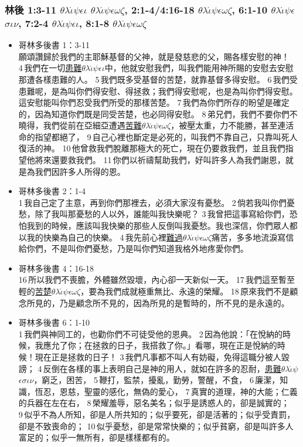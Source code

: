 \subsubsection{林後 1:3-11 $\theta$$\lambda$$\acute{\iota}$$\psi$$\epsilon$$\iota$ $\theta$$\lambda$$\acute{\iota}$$\psi$$\epsilon$$\omega$$\zeta$,  2:1-4/4:16-18 $\theta$$\lambda$$\acute{\iota}$$\psi$$\epsilon$$\omega$$\zeta$, 6:1-10 $\theta$$\lambda$$\acute{\iota}$$\psi$$\epsilon$$\sigma$$\iota$$\nu$,  7:2-4 $\theta$$\lambda$$\acute{\iota}$$\psi$$\epsilon$$\iota$, 8:1-8 $\theta$$\lambda$$\acute{\iota}$$\psi$$\epsilon$$\omega$$\zeta$}
\begin{itemize} 
\itemsep-.25em
\item{哥林多後書 1：3-11}\\ 願頌讚歸於我們的主耶穌基督的父神，就是發慈悲的父，賜各樣安慰的神！ 4 我們在一切\underline{患難$\theta$$\lambda$$\acute{\iota}$$\psi$$\epsilon$$\iota$}中，他就安慰我們，叫我們能用神所賜的安慰去安慰那遭各樣患難的人。 5 我們既多受基督的苦楚，就靠基督多得安慰。 6 我們受患難呢，是為叫你們得安慰、得拯救；我們得安慰呢，也是為叫你們得安慰。這安慰能叫你們忍受我們所受的那樣苦楚。 7 我們為你們所存的盼望是確定的，因為知道你們既是同受苦楚，也必同得安慰。 8 弟兄們，我們不要你們不曉得，我們從前在亞細亞遭遇\underline{苦難$\theta$$\lambda$$\acute{\iota}$$\psi$$\epsilon$$\omega$$\zeta$}，被壓太重，力不能勝，甚至連活命的指望都絕了， 9 自己心裡也斷定是必死的，叫我們不靠自己，只靠叫死人復活的神。 10 他曾救我們脫離那極大的死亡，現在仍要救我們，並且我們指望他將來還要救我們。 11 你們以祈禱幫助我們，好叫許多人為我們謝恩，就是為我們因許多人所得的恩。
\item{哥林多後書 2：1-4} \\ 1 我自己定了主意，再到你們那裡去，必須大家沒有憂愁。 2 倘若我叫你們憂愁，除了我叫那憂愁的人以外，誰能叫我快樂呢？ 3 我曾把這事寫給你們，恐怕我到的時候，應該叫我快樂的那些人反倒叫我憂愁。我也深信，你們眾人都以我的快樂為自己的快樂。 4 我先前心裡\underline{難過$\theta$$\lambda$$\acute{\iota}$$\psi$$\epsilon$$\omega$$\zeta$}痛苦，多多地流淚寫信給你們，不是叫你們憂愁，乃是叫你們知道我格外地疼愛你們。
\item{哥林多後書 4：16-18} \\ 16 所以我們不喪膽，外體雖然毀壞，內心卻一天新似一天。 17 我們這至暫至輕的\underline{苦楚$\theta$$\lambda$$\acute{\iota}$$\psi$$\epsilon$$\omega$$\zeta$}，要為我們成就極重無比、永遠的榮耀。 18 原來我們不是顧念所見的，乃是顧念所不見的，因為所見的是暫時的，所不見的是永遠的。     
\item{哥林多後書 6：1-10} \\1 我們與神同工的，也勸你們不可徒受他的恩典。 2 因為他說：「在悅納的時候，我應允了你；在拯救的日子，我搭救了你。」看哪，現在正是悅納的時候！現在正是拯救的日子！ 3 我們凡事都不叫人有妨礙，免得這職分被人毀謗； 4 反倒在各樣的事上表明自己是神的用人，就如在許多的忍耐，\underline{患難$\theta$$\lambda$$\acute{\iota}$$\psi$$\epsilon$$\sigma$$\iota$$\nu$}，窮乏，困苦， 5 鞭打，監禁，擾亂，勤勞，警醒，不食， 6 廉潔，知識，恆忍，恩慈，聖靈的感化，無偽的愛心， 7 真實的道理，神的大能；仁義的兵器在左在右， 8 榮耀羞辱，惡名美名；似乎是誘惑人的，卻是誠實的； 9 似乎不為人所知，卻是人所共知的；似乎要死，卻是活著的；似乎受責罰，卻是不致喪命的； 10 似乎憂愁，卻是常常快樂的；似乎貧窮，卻是叫許多人富足的；似乎一無所有，卻是樣樣都有的。    

\end{itemize}
